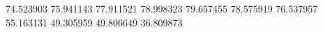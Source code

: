 74.523903
75.941143
77.911521
78.998323
79.657455
78.575919
76.537957
55.163131
49.305959
49.806649
36.809873
